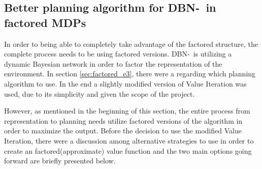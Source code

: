\subsection{Better planning algorithm for DBN-\etre\ in factored MDPs}
\label{sec:better_planing_algos}


In order to being able to completely take advantage of the factored structure,
the complete process needs to be using factored versions. DBN-\etre\ is
utilizing a dynamic Bayesian network in order to factor the representation of
the environment. In section \ref{sec:factored_e3}, there were a
 regarding which planning algorithm to use. In the end a
slightly modified version of Value Iteration was used, due to its simplicity
and given the scope of the project. 

However, as mentioned in the beginning of this section, the entire process from representation to planning needs utilize factored versions of the algorithm in order to maximize the output. Before the decision to use the modified Value Iteration, there were a discussion among alternative strategies to use in order to create an factored(approximate) value function and the two main options going forward are briefly presented below.




